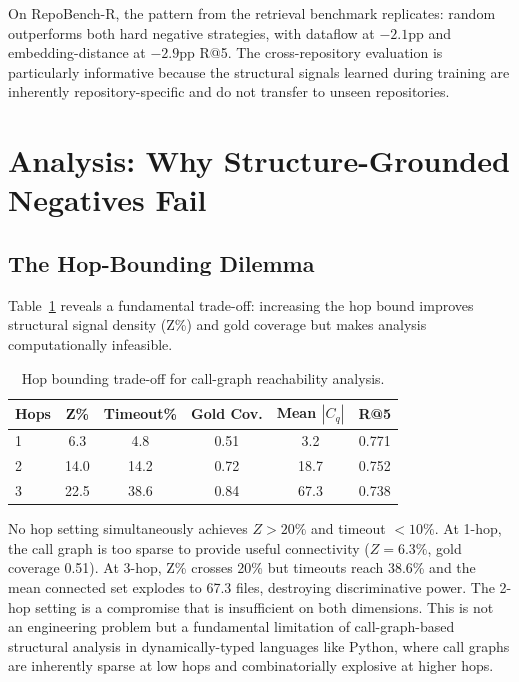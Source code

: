 \documentclass[11pt]{article}
\begin{document}
On RepoBench-R, the pattern from the retrieval benchmark replicates: random outperforms both hard negative strategies, with dataflow at $-2.1$pp and embedding-distance at $-2.9$pp R@5. The cross-repository evaluation is particularly informative because the structural signals learned during training are inherently repository-specific and do not transfer to unseen repositories.

\section{Analysis: Why Structure-Grounded Negatives Fail}
\label{sec:analysis}

\subsection{The Hop-Bounding Dilemma}

Table~\ref{tab:hops} reveals a fundamental trade-off: increasing the hop bound improves structural signal density (Z\%) and gold coverage but makes analysis computationally infeasible.

\begin{table}[t]
\centering
\caption{Hop bounding trade-off for call-graph reachability analysis.}
\label{tab:hops}
\begin{tabular}{lccccc}
\toprule
\textbf{Hops} & \textbf{Z\%} & \textbf{Timeout\%} & \textbf{Gold Cov.} & \textbf{Mean $|C_q|$} & \textbf{R@5} \\
\midrule
1 & 6.3  & 4.8  & 0.51 & 3.2  & 0.771 \\
2 & 14.0 & 14.2 & 0.72 & 18.7 & 0.752 \\
3 & 22.5 & 38.6 & 0.84 & 67.3 & 0.738 \\
\bottomrule
\end{tabular}
\end{table}

No hop setting simultaneously achieves $Z > 20\%$ and timeout $< 10\%$. At 1-hop, the call graph is too sparse to provide useful connectivity ($Z = 6.3\%$, gold coverage 0.51). At 3-hop, Z\% crosses 20\% but timeouts reach 38.6\% and the mean connected set explodes to 67.3 files, destroying discriminative power. The 2-hop setting is a compromise that is insufficient on both dimensions. This is not an engineering problem but a fundamental limitation of call-graph-based structural analysis in dynamically-typed languages like Python, where call graphs are inherently sparse at low hops and combinatorially explosive at higher hops.
\end{document}
